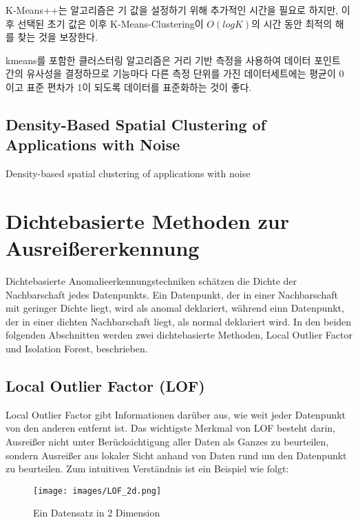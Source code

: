                 K-Means++는 알고리즘은 기 값을 설정하기 위해 추가적인 시간을 필요로 하지만, 이후 선택된 초기 값은 이후 K-Means-Clustering이 $O(log K)$의 시간 동안 최적의 해를 찾는 것을 보장한다.
                
                

                kmeans를 포함한 클러스터링 알고리즘은 거리 기반 측정을 사용하여 데이터 포인트 간의 유사성을 결정하므로 기능마다 다른 측정 단위를 가진 데이터세트에는 평균이 0이고 표준 편차가 1이 되도록 데이터를 표준화하는 것이 좋다.
                
            \subsection{Density-Based Spatial Clustering of Applications with Noise}
                Density-based spatial clustering of applications with noise
                
        \section{Dichtebasierte Methoden zur Ausreißererkennung}
            Dichtebasierte Anomalieerkennungstechniken schätzen die Dichte der Nachbarschaft jedes Datenpunkts. Ein Datenpunkt, der in einer Nachbarschaft mit geringer Dichte liegt, wird als anomal deklariert, während einn Datenpunkt, der in einer dichten Nachbarschaft liegt, als normal deklariert wird. In den beiden folgenden Abschnitten werden zwei dichtebasierte Methoden, Local Outlier Factor und Isolation Forest, beschrieben.
            
            \subsection{Local Outlier Factor (LOF)}
                Local Outlier Factor gibt Informationen darüber aus, wie weit jeder Datenpunkt von den anderen entfernt ist. Das wichtigste Merkmal von LOF besteht darin, Ausreißer nicht unter Berücksichtigung aller Daten als Ganzes zu beurteilen, sondern Ausreißer aus lokaler Sicht anhand von Daten rund um den Datenpunkt zu beurteilen. Zum intuitiven Verständnis ist ein Beispiel wie folgt:

                \begin{figure}[h] %
                    \centering \texttt{[image: images/LOF\_2d.png]}
                    \caption{Ein Datensatz in 2 Dimension \cite{Breunig00}}
                    \label{fig:LOF_2d}
                \end{figure}

